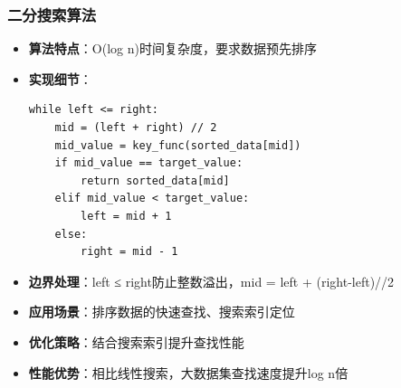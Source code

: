 \documentclass[12pt,a4paper]{article}
\begin{document}
\subsubsection{二分搜索算法}
\begin{itemize}
    \item \textbf{算法特点}：O(log n)时间复杂度，要求数据预先排序
    \item \textbf{实现细节}：
    \begin{verbatim}
while left <= right:
    mid = (left + right) // 2
    mid_value = key_func(sorted_data[mid])
    if mid_value == target_value:
        return sorted_data[mid]
    elif mid_value < target_value:
        left = mid + 1
    else:
        right = mid - 1
    \end{verbatim}
    \item \textbf{边界处理}：left ≤ right防止整数溢出，mid = left + (right-left)//2
    \item \textbf{应用场景}：排序数据的快速查找、搜索索引定位
    \item \textbf{优化策略}：结合搜索索引提升查找性能
    \item \textbf{性能优势}：相比线性搜索，大数据集查找速度提升log n倍
\end{itemize}
\end{document}

